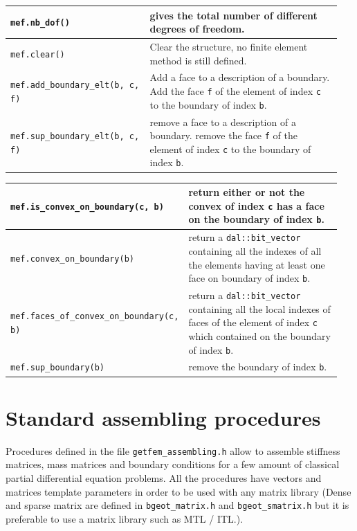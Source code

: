 \documentclass[11pt,a4paper]{article}
\begin{document}
\begin{center}
\begin{tabular}{|m{0.4\linewidth}|m{0.55\linewidth}|}
  {\tt mef.nb\_dof()} & gives the total number of different degrees of freedom.  \\ \hline

  {\tt mef.clear()} & Clear the structure, no finite element method is still defined.  \\ \hline

  {\tt mef.add\_boundary\_elt(b, c, f)} & Add a face to a description of a boundary. Add the face {\tt f} of the element of index {\tt c} to the boundary of index {\tt b}.  \\ \hline
  
  {\tt mef.sup\_boundary\_elt(b, c, f)} & remove a face to a description of a boundary. remove the face {\tt f} of the element of index {\tt c} to the boundary of index {\tt b}.  \\ \hline
\end{tabular} \end{center}

\begin{center} \begin{tabular}{|m{0.4\linewidth}|m{0.55\linewidth}|} \hline
  
  {\tt mef.is\_convex\_on\_boundary(c, b)} & return either or not the convex of index {\tt c}  has a face on the boundary of index {\tt b}.  \\ \hline
  
  {\tt mef.convex\_on\_boundary(b)} & return a {\tt dal::bit\_vector} containing all the indexes of all the elements having at least one face on boundary of index {\tt b}.  \\ \hline

  {\tt mef.faces\_of\_convex\_on\_boundary(c, b) } & return a {\tt dal::bit\_vector} containing all the local indexes of faces of the element of index {\tt c} which contained on the boundary of index {\tt b}.  \\ \hline

  {\tt mef.sup\_boundary(b) } & remove the boundary of index {\tt b}.  \\ \hline

\end{tabular} \end{center}


\section{Standard assembling procedures}

Procedures defined in the file {\tt getfem\_assembling.h} allow to assemble stiffness matrices, mass matrices and boundary conditions for a few amount of classical partial differential equation problems. All the procedures have vectors and matrices template parameters in order to be used with any matrix library (Dense and sparse matrix are defined in {\tt bgeot\_matrix.h} and {\tt bgeot\_smatrix.h} but it is preferable to use a matrix library such as MTL / ITL.).
\end{document}
